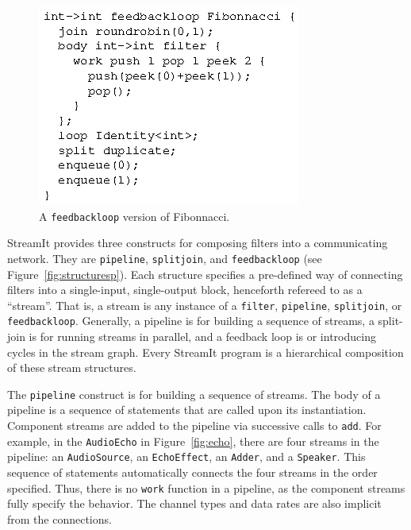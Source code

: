 \begin{figure}
\centering
\includegraphics{fib-streamit.eps}
\caption{A \texttt{feedbackloop} version of Fibonnacci.}
\label{fig:feed}
\end{figure}

StreamIt provides three constructs for composing filters into a
communicating network. They are \texttt{pipeline}, \texttt{splitjoin}, and
\texttt{feedbackloop} (see Figure~\ref{fig:structuresp}).  Each
structure  specifies a pre-defined  way of  connecting filters  into a
single-input,  single-output   block,  henceforth  refereed   to  as  a
``stream''.  That is, a stream is any instance of a \texttt{filter},
\texttt{pipeline}, \texttt{splitjoin}, or \texttt{feedbackloop}. 
Generally,  a  pipeline is  for  building  a  sequence of  streams,  a
split-join is for running streams  in parallel, and a feedback loop is
or introducing cycles in the  stream graph.  Every StreamIt program is
a hierarchical composition of these stream structures.

The \texttt{pipeline} construct is for building a sequence of
streams.  The body of a pipeline is a sequence of statements that are
called upon its instantiation.  Component streams are added to the
pipeline via successive calls to \texttt{add}.  For example, in the
\texttt{AudioEcho} in Figure~\ref{fig:echo}, there are four streams in
the pipeline: an \texttt{AudioSource}, an \texttt{EchoEffect}, an
\texttt{Adder}, and a \texttt{Speaker}.  This sequence of statements
automatically connects the four streams in the order specified.
Thus, there is no \texttt{work} function in a pipeline, as the
component streams fully specify the behavior.  The channel types and
data rates are also implicit from the connections.


